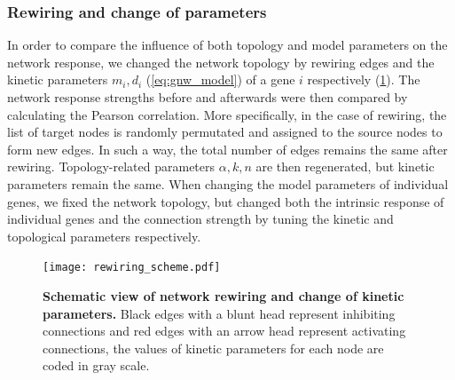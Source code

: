 
\subsubsection{Rewiring and change of parameters}
In order to compare the influence of both topology and model parameters on 
the network response, we changed the network topology by rewiring edges and 
the kinetic parameters $m_i, d_i$ (\ref{eq:gnw_model}) of a gene $i$ 
respectively (\ref{fig:rewiring_scheme}). The
network response strengths before and afterwards were then compared by
calculating the Pearson correlation. More specifically, in the case of 
rewiring, the list of target nodes is randomly permutated and assigned to the
source nodes to form new edges. 
In such a way, the total number of edges
remains the same after rewiring. 
Topology-related parameters $\alpha, k, n$ are
then regenerated, but kinetic parameters remain the same. 
When changing the model parameters of individual genes, we fixed the network
topology, but changed both the intrinsic response of individual genes and 
the connection strength by tuning the kinetic and topological parameters 
respectively.

\begin{figure}[!ht]
\begin{center}
\texttt{[image: rewiring\_scheme.pdf]}
\end{center}
\caption[Schematic view of network rewiring and kinetic parameter change]{
{\bf Schematic view of network rewiring and change of kinetic parameters.} 
Black edges with a blunt head represent inhibiting
connections and red edges with an arrow head represent activating
connections, the values of kinetic parameters for each node are 
coded in gray scale. 
}
\label{fig:rewiring_scheme}
\end{figure}

